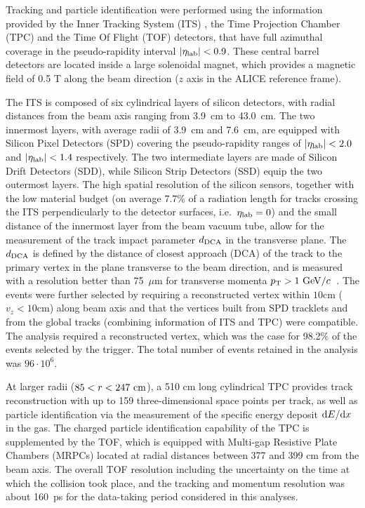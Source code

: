 Tracking and particle identification were performed using the information provided by the Inner Tracking System (ITS) \cite{Aamodt:2010aa}, the Time Projection Chamber (TPC) \cite{Alme:2010ke} and the Time Of Flight (TOF) \cite{Akindinov:2013tea} detectors, that have full azimuthal coverage in the pseudo-rapidity interval $|\eta_{\rm lab}|<0.9$. 
These central barrel detectors are located inside a large solenoidal magnet, which provides a magnetic field of 0.5 T along the beam direction ($z$ axis in the ALICE reference frame). 

The ITS is composed of six cylindrical layers of silicon detectors, with radial distances from the beam axis ranging from 3.9~cm to 43.0~cm. 
The two innermost layers, with average radii of 3.9~cm and 7.6~cm, are equipped with Silicon Pixel Detectors (SPD) covering the pseudo-rapidity ranges of $|\eta_{\rm lab}|< 2.0$ and $|\eta_{\rm lab}|< 1.4$ respectively.
The two intermediate layers are made of Silicon Drift Detectors (SDD), while Silicon Strip Detectors (SSD) equip the two outermost layers. 
The high spatial resolution of the silicon sensors, together with the low material budget (on average 7.7\% of a radiation length for tracks crossing the ITS perpendicularly to the detector surfaces, i.e.\ $\eta_{\rm lab}=0$) and the small distance of the innermost layer from the beam vacuum tube, allow for the measurement of the track impact parameter $d_{\rm DCA}$ in the transverse plane.
The $d_{\rm DCA}$ is defined by the distance of closest approach (DCA) of the track to the primary vertex in the plane transverse to the beam direction, and is measured with a resolution better than 75~$\mu$m for transverse momenta $p_{\mathrm{T}}>1~\mathrm{GeV}/c$~\cite{Aamodt:2010aa}.
The events were further selected by requiring a reconstructed vertex within $10$cm ($v_{z}<10$cm) along beam axis and that the vertices built from SPD tracklets and from the global tracks (combining information of ITS and TPC) were compatible. 
The analysis required a reconstructed vertex, which was the case for 98.2\% of the events selected by the trigger. The total number of events retained in the analysis was $96\cdot10^{6}$.

At larger radii ($85<r<247~\mathrm{cm}$), a 510 cm long cylindrical TPC provides track reconstruction with up to 159 three-dimensional space points per track, as well as particle identification via the measurement of the specific energy deposit ${\rm d}E/{\rm d}x$ in the gas.
The charged particle identification capability of the TPC is supplemented by the TOF, which is equipped with Multi-gap Resistive Plate Chambers  (MRPCs) located at radial distances between 377 and 399 cm from the beam axis. The overall TOF resolution including the uncertainty on the time at which the collision took place, and the tracking and momentum resolution was about 160~ps for the data-taking period considered in this analyses. 

